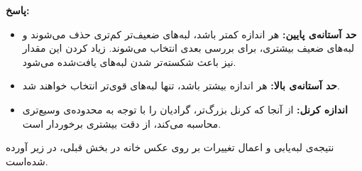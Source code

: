 \documentclass[12pt,a4paper]{article}
\theoremstyle{definition}
\theoremstyle{theorem}
\theoremstyle{definition}
\begin{document}
\textbf{پاسخ: }

\begin{itemize}
\renewcommand{\labelitemi}{$\bullet$}
\item \textbf{حد آستانه‌ی پایین:‌ } 
هر اندازه کمتر باشد، لبه‌های ضعیف‌تر کم‌تری حذف می‌شوند و لبه‌های ضعیف بیشتری، برای بررسی بعدی انتخاب می‌شوند. زیاد کردن این مقدار نیز باعث شکسته‌تر شدن لبه‌های یافت‌شده می‌شود.
\item \textbf{حد آستانه‌ی بالا: } 
هر اندازه بیشتر باشد، تنها لبه‌های قوی‌تر انتخاب خواهند شد. 
\item \textbf{اندازه کرنل: } 
از آنجا که کرنل بزرگ‌تر، گرادیان را با توجه به محدوده‌ی وسیع‌تری محاسبه می‌کند، از دقت بیشتری برخوردار است.
\end{itemize}
نتیجه‌ی لبه‌یابی و اعمال تغییرات بر روی عکس خانه در بخش قبلی، در زیر آورده شده‌است.

\vspace{0.2cm}
\begin{center}
\end{center}
\end{document}
